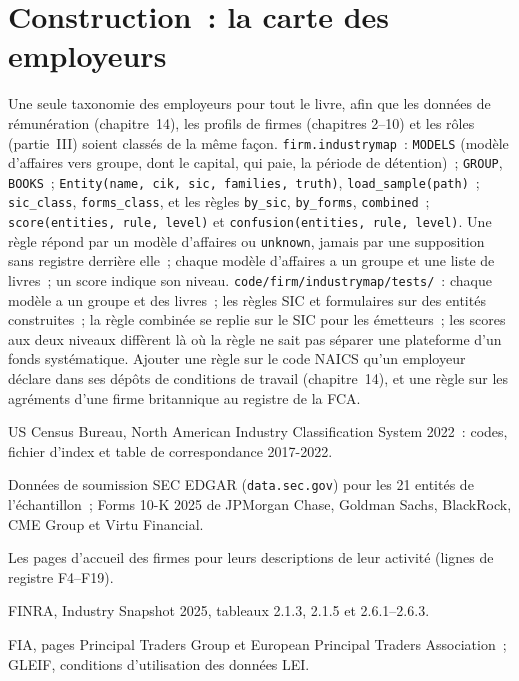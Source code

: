 \section{Construction~: la carte des employeurs}\label{bld:in:a-map-of-the-industry:industrymap}

\begin{build}
 Une seule taxonomie des employeurs pour tout le livre, afin que les données de rémunération (chapitre~14), les profils de firmes (chapitres
2--10) et les rôles (partie~III) soient classés de la même façon.
 \texttt{firm.industrymap}~: \texttt{MODELS} (modèle d'affaires vers groupe, dont le capital, qui paie, la
période de détention)~; \texttt{GROUP}, \texttt{BOOKS}~; \texttt{Entity(name, cik, sic, families, truth)}, \texttt{load\_sample(path)}~;
\texttt{sic\_class}, \texttt{forms\_class}, et les règles \texttt{by\_sic}, \texttt{by\_forms}, \texttt{combined}~;
\texttt{score(entities, rule, level)} et \texttt{confusion(entities, rule, level)}.
 Une règle répond par un modèle d'affaires ou \texttt{unknown}, jamais par une supposition sans registre derrière elle~; chaque
modèle d'affaires a un groupe et une liste de livres~; un score indique son niveau.
 \texttt{code/firm/industrymap/tests/}~: chaque modèle a un groupe et des livres~; les règles SIC et formulaires sur
des entités construites~; la règle combinée se replie sur le SIC pour les émetteurs~; les scores aux deux niveaux diffèrent là où la règle
ne sait pas séparer une plateforme d'un fonds systématique.
 Ajouter une règle sur le code NAICS qu'un employeur déclare dans ses dépôts de conditions de travail (chapitre~14), et
une règle sur les agréments d'une firme britannique au registre de la FCA.
\end{build}

\begin{omsources}
\item US Census Bureau, North American Industry Classification System 2022~: codes, fichier d'index et table de
correspondance 2017-2022.
\item Données de soumission SEC EDGAR (\texttt{data.sec.gov}) pour les 21 entités de l'échantillon~; Forms 10-K 2025 de
JPMorgan Chase, Goldman Sachs, BlackRock, CME Group et Virtu Financial.
\item Les pages d'accueil des firmes pour leurs descriptions de leur activité (lignes de registre F4--F19).
\item FINRA, Industry Snapshot 2025, tableaux 2.1.3, 2.1.5 et 2.6.1--2.6.3.
\item FIA, pages Principal Traders Group et European Principal Traders Association~; GLEIF, conditions d'utilisation des données LEI.
\end{omsources}

